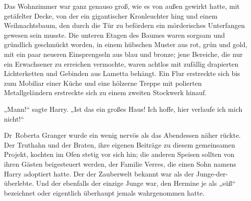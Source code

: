 Das Wohnzimmer war ganz genauso groß, wie es von außen gewirkt hatte, mit getäfelter Decke, von der ein gigantischer Kronleuchter hing und einem Weihnachtsbaum, den durch die Tür zu befördern ein mörderisches Unterfangen gewesen sein musste. Die unteren Etagen des Baumes waren sorgsam und gründlich geschmückt worden, in einem hübschen Muster aus rot, grün und gold, mit ein paar neueren Einsprengseln aus blau und bronze; jene Bereiche, die nur ein Erwachsener zu erreichen vermochte, waren achtlos mit zufällig drapierten Lichterketten und Gebinden aus Lametta behängt. Ein Flur erstreckte sich bis zum Mobiliar einer Küche und eine hölzerne Treppe mit polierten Metallgeländern erstreckte sich zu einem zweiten Stockwerk hinauf.

„Mann!“ sagte Harry.
„Ist das ein großes Haus! Ich hoffe, hier verlaufe ich mich nicht!“

\later

Dr~Roberta Granger wurde ein wenig nervös als das Abendessen näher rückte. Der Truthahn und der Braten, ihre eigenen Beiträge zu diesem gemeinsamen Projekt, kochten im Ofen stetig vor sich hin; die anderen Speisen sollten von ihren Gästen beigesteuert werden, der Familie Verres, die einen Sohn namens Harry adoptiert hatte. Der der Zauberwelt bekannt war als der Junge-der-überlebte. Und der ebenfalls der einzige Junge war, den Hermine je als „süß“ bezeichnet oder eigentlich überhaupt jemals wahrgenommen hatte.


